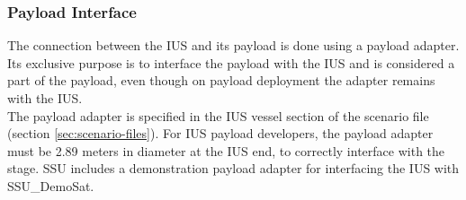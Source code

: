 \documentclass[Space_Shuttle_Ultra_Manual.tex]{subfiles}
\begin{document}
\begin{multicols*}{2}
\subsubsection{Payload Interface}
The connection between the IUS and its payload is done using a payload adapter. Its exclusive purpose is to interface the payload with the IUS and is considered a part of the payload, even though on payload deployment the adapter remains with the IUS.\\
The payload adapter is specified in the IUS vessel section of the scenario file (section \ref{sec:scenario-files}).
For IUS payload developers, the payload adapter must be 2.89 meters in diameter at the IUS end, to correctly interface with the stage. SSU includes a demonstration payload adapter for interfacing the IUS with SSU\_DemoSat.

\end{multicols*}
\end{document}
